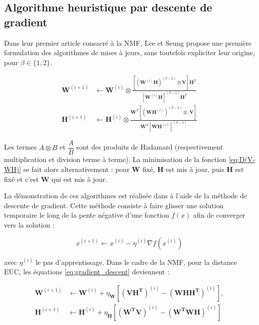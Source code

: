 \subsection{Algorithme heuristique par descente de gradient}

Dans leur premier article consacré à la NMF, Lee et Seung \cite{lee_learning_1999} propose une première formulation des algorithmes de mises à jours, sans toutefois expliciter leur origine,  pour $\beta  \in \lbrace 1,2 \rbrace$.

\begin{subequations}\label{eq:WHupdateGD}
\begin{align}
\textbf{W}^{(i+1)} &\leftarrow \textbf{W}^{(i)}\otimes\frac{\left[\left(\textbf{W}^{(i)}\mathbf{H} \right)^{(\beta-2)}\otimes\textbf{V} \right]\textbf{H}^T}{\left[\textbf{W}^{(i)}\mathbf{H} \right]^{(\beta-1)}\textbf{H}^T}\\
\textbf{H}^{(i+1)} &\leftarrow \textbf{H}^{(i)}\otimes\frac{\textbf{W}^T \left[\left(\textbf{WH}^{(i)} \right)^{(\beta-2)}\otimes.\textbf{V} \right]}{\textbf{W}^T \left[\textbf{WH}^{(i)} \right]^{(\beta-1)}}
\end{align}
\end{subequations}

Les termes $A\otimes B$ et $\dfrac{A}{B}$ sont des produits de Hadamard (respectivement multiplication et division terme à terme). La minimisation de la fonction \ref{eq:D(V-WH)} se fait alors alternativement : pour $\mathbf{W}$ fixé, $\mathbf{H}$ est mis à jour, puis $\mathbf{H}$ est fixé et c'est $\mathbf{W}$ qui est mis à jour.

La démonstration de ces algorithmes est réalisée dans \cite{lee_algorithms_2000} à l'aide de la méthode de descente de gradient. Cette méthode consiste à faire \og glisser \fg {} une solution temporaire le long de la pente négative d'une fonction $f(x)$ afin de converger vers la solution \cite{kivinen_exponentiated_1994} :

\begin{equation}\label{eq:gradient_descent}
x^{(i+1)} \leftarrow x^{(i)} - \eta^{(i)} \nabla f(x^{(i)})
\end{equation}

avec $\eta^{(i)}$ le pas d'apprentissage. Dans le cadre de la NMF, pour la distance EUC, les équations \ref{eq:gradient_descent} deviennent :

\begin{subequations}\label{eq:WHgradientDescente}
    \begin{align}
     \mathbf{W}^{(i+1)} & \leftarrow \mathbf{W}^{(i)}+\eta_{\mathbf{W}}\left[ \left(\mathbf{V H^T}\right)^{(i)} - \left(\mathbf{W H H^T}\right)^{(i)} \right ], \\
      \mathbf{H}^{(i+1)} & \leftarrow \mathbf{H}^{(i)}+\eta_{\mathbf{H}}\left[ \left(\mathbf{W^TV}\right)^{(i)}-\left(\mathbf{W^T W H} \right)^{(i)}\right ]
    \end{align}
\end{subequations}

